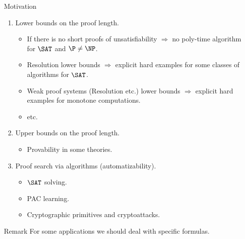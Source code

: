 \begin{frame}{Motivation}

    \begin{enumerate}
        \item Lower bounds on the proof length.
            \begin{itemize}
                \item If there is no short proofs of unsatisfiability $\Rightarrow$ no poly-time
                    algorithm for $\SAT$ and $\P \neq \NP$.
                    \pause
                \item Resolution lower bounds $\Rightarrow$ explicit hard examples for some classes of
                    algorithms for $\SAT$.
                    \pause
                \item Weak proof systems (Resolution etc.) lower bounds $\Rightarrow$ explicit hard
                    examples for \alert{monotone} computations.
                    \pause
                \item etc.
            \end{itemize}
        \pause
        \item Upper bounds on the proof length.
            \begin{itemize}
                \item Provability in some theories.
            \end{itemize}
        \pause
        \item Proof search via algorithms (automatizability).
            \begin{itemize}
                \item $\SAT$ solving.
                \pause
                \item PAC learning.
                \pause
                \item Cryptographic primitives and cryptoattacks.
            \end{itemize}            
    \end{enumerate}

    \pause
    \vspace{0.7cm}
    \begin{block}{Remark}
        For some applications we should deal with specific formulas.        
    \end{block}
\end{frame}


